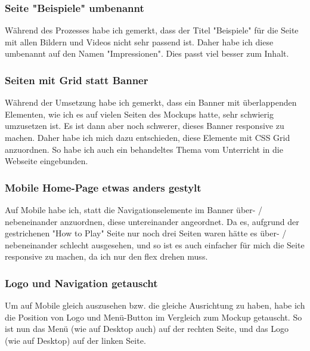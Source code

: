 \documentclass[11pt]{article}
\begin{document}
    \subsubsection{Seite "Beispiele" umbenannt}
    Während des Prozesses habe ich gemerkt, dass der Titel "Beispiele" für die Seite mit allen Bildern und Videos nicht sehr passend ist. Daher habe ich
    diese umbenannt auf den Namen "Impressionen". Dies passt viel besser zum Inhalt.

    \subsubsection{Seiten mit Grid statt Banner}
    Während der Umsetzung habe ich gemerkt, dass ein Banner mit überlappenden Elementen, wie ich es auf vielen Seiten des Mockups hatte, sehr
    schwierig umzusetzen ist. Es ist dann aber noch schwerer, dieses Banner responsive zu machen. Daher habe ich mich dazu entschieden,
    diese Elemente mit CSS Grid anzuordnen. So habe ich auch ein behandeltes Thema vom Unterricht in die Webseite eingebunden.

    \subsubsection{Mobile Home-Page etwas anders gestylt}
    Auf Mobile habe ich, statt die Navigationselemente im Banner über- / nebeneinander anzuordnen, diese untereinander angeordnet. Da es, aufgrund
    der gestrichenen "How to Play" Seite nur noch drei Seiten waren hätte es über- / nebeneinander schlecht ausgesehen, und so ist es auch
    einfacher für mich die Seite responsive zu machen, da ich nur den flex drehen muss.

    \subsubsection{Logo und Navigation getauscht}
    Um auf Mobile gleich auszusehen bzw. die gleiche Ausrichtung zu haben, habe ich die Position von Logo und Menü-Button im Vergleich zum Mockup
    getauscht. So ist nun das Menü (wie auf Desktop auch) auf der rechten Seite, und das Logo (wie auf Desktop) auf der linken Seite.

\end{document}
